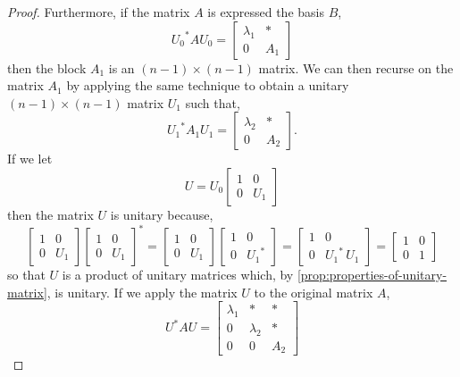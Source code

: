 \documentclass[../MathsNotesBase.tex]{subfiles}
\begin{document}
{\begin{proof}
			Furthermore, if the matrix $A$ is expressed \wrt the basis $B$,
			\[ 
				{U_0}^* A U_0 = \begin{bmatrix}
									\lambda_1 & * \\
									0		  & A_1
								\end{bmatrix}
			\]
			then the block $A_1$ is an ${ (n - 1) \times (n - 1) }$ matrix. We can then recurse on the matrix $A_1$ by applying the same technique to obtain a unitary ${ (n - 1) \times (n - 1) }$ matrix $U_1$ such that,
			\[
				{U_1}^* A_1 U_1 = 	\begin{bmatrix}
										\lambda_2 & * \\
										0		  & A_2
									\end{bmatrix}.
			\]
			If we let
			\[ 
				U = U_0 \begin{bmatrix}
							1 & 0 \\
							0 & U_1
						\end{bmatrix} 
			\]
			then the matrix $U$ is unitary because,
			\[
				\begin{bmatrix}
				 	1 & 0 \\
				 	0 & U_1
				\end{bmatrix}
			 	\begin{bmatrix}
			 		1 & 0 \\
			 		0 & U_1
			 	\end{bmatrix}^* = 
		 		\begin{bmatrix}
		 			1 & 0 \\
		 			0 & U_1
		 		\end{bmatrix}
		 		\begin{bmatrix}
		 			1 & 0 \\
		 			0 & {U_1}^*
		 		\end{bmatrix} =
	 			\begin{bmatrix}
	 				1 & 0 \\
	 				0 & {U_1}^* \, U_1
	 			\end{bmatrix} =
	 			\begin{bmatrix}
	 				1 & 0 \\
	 				0 & 1
	 			\end{bmatrix}
			\]
			so that $U$ is a product of unitary matrices which, by \autoref{prop:properties-of-unitary-matrix}, is unitary. If we apply the matrix $U$ to the original matrix $A$,
			\[
				U^* A U = 	\begin{bmatrix}
								\lambda_1 & * 		  & * \\
								0		  & \lambda_2 & * \\
								0 		  & 0		  & A_2

\end{bmatrix}\]
\end{proof}}
\end{document}
